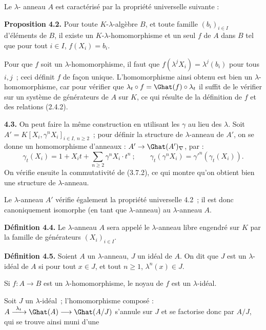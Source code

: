 Le \(\lambda\)-
anneau \(A\) est caractérisé par la propriété universelle suivante :

\textbf{Proposition 4.2.} Pour toute \(K\)-\(\lambda\)-algèbre \(B\), et toute famille \((b_i)_{i\in I}\) d'éléments de \(B\), il existe un \(K\)-\(\lambda\)-homomorphisme et un seul \(f\) de \(A\) dans \(B\) tel que pour tout \(i\in I\), \(f(X_i)=b_i\).

Pour que \(f\) soit un \(\lambda\)-homomorphisme, il faut que \(f(\lambda^j X_i)=\lambda^j(b_i)\) pour tous \(i,j\)~; ceci définit \(f\) de façon unique. L'homomorphisme ainsi obtenu est bien un \(\lambda\)-homomorphisme, car pour vérifier que \(\lambda_t\circ f=\Ghat(f)\circ\lambda_t\) il suffit de le vérifier sur un système de générateurs de \(A\) sur \(K\), ce qui résulte de la définition de \(f\) et des relations (2.4.2).

\textbf{4.3.} On peut faire la même construction en utilisant les \(\gamma\) au lieu des \(\lambda\). Soit \(A'=K[X_i,\gamma^n X_i]_{i\in I,\ n\ge2}\)~; pour définir la structure de \(\lambda\)-anneau de \(A'\), on se donne un homomorphisme d'anneaux : \(A'\to\Ghat(A')_\nabla\), par :
\begin{equation}\tag{4.3.1}
  \gamma_t(X_i)=1+X_it+\sum_{n\ge2}\gamma^n X_i\cdot t^n~;
  \qquad
  \gamma_t(\gamma^n X_i)=\gamma'^n(\gamma_t(X_i)).
\end{equation}
On vérifie ensuite la commutativité de (3.7.2), ce qui montre qu'on obtient bien une structure de \(\lambda\)-anneau.

Le \(\lambda\)-anneau \(A'\) vérifie également la propriété universelle 4.2~; il est donc canoniquement isomorphe (en tant que \(\lambda\)-anneau) au \(\lambda\)-anneau \(A\).

\textbf{Définition 4.4.} Le \(\lambda\)-anneau \(A\) sera appelé le \(\lambda\)-anneau libre engendré sur \(K\) par la famille de générateurs \((X_i)_{i\in I}\).

\textbf{Définition 4.5.} Soient \(A\) un \(\lambda\)-anneau, \(J\) un idéal de \(A\). On dit que \(J\) est un \(\lambda\)-idéal de \(A\) si pour tout \(x\in J\), et tout \(n\ge1\), \(\lambda^n(x)\in J\).

Si \(f:A\to B\) est un \(\lambda\)-homomorphisme, le noyau de \(f\) est un \(\lambda\)-idéal.

Soit \(J\) un \(\lambda\)-idéal~; l'homomorphisme composé : \(A\xrightarrow{\ \lambda_t\ }\Ghat(A)\longrightarrow\Ghat(A/J)\) s'annule sur \(J\) et se factorise donc par \(A/J\), qui se trouve ainsi muni d'une
